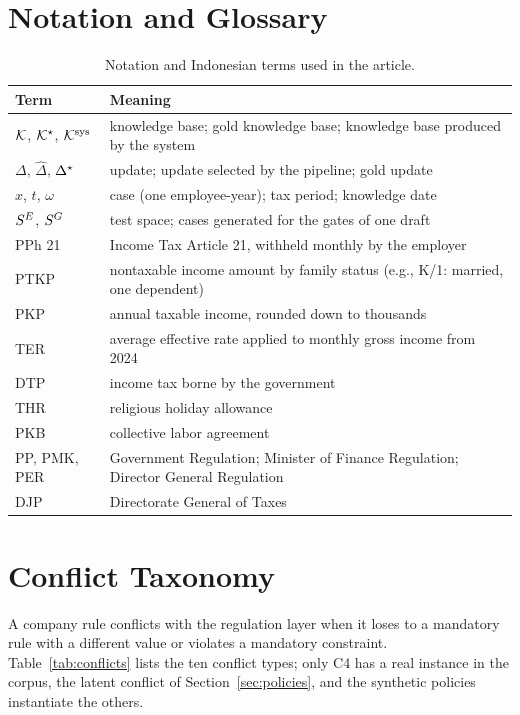 \section{Notation and Glossary}
\label{app:glossary}
\begin{table}[!h]
\caption{Notation and Indonesian terms used in the article.}
\label{tab:glossary}
\centering\footnotesize
\setlength{\tabcolsep}{3pt}
\begin{tabularx}{\columnwidth}{@{}lL@{}}
\toprule
Term & Meaning \\
\midrule
$\mathcal{K}$, $\mathcal{K}^\star$, $\mathcal{K}^{\mathrm{sys}}$ & knowledge base; gold knowledge base; knowledge base produced by the system \\
$\Delta$, $\hat{\Delta}$, $\Delta^\star$ & update; update selected by the pipeline; gold update \\
$x$, $t$, $\omega$ & case (one employee-year); tax period; knowledge date \\
$S^{E}$, $S^{G}$ & test space; cases generated for the gates of one draft \\
PPh 21 & Income Tax Article 21, withheld monthly by the employer \\
PTKP & nontaxable income amount by family status (e.g., K/1: married, one dependent) \\
PKP & annual taxable income, rounded down to thousands \\
TER & average effective rate applied to monthly gross income from 2024 \\
DTP & income tax borne by the government \\
THR & religious holiday allowance \\
PKB & collective labor agreement \\
PP, PMK, PER & Government Regulation; Minister of Finance Regulation; Director General Regulation \\
DJP & Directorate General of Taxes \\
\bottomrule
\end{tabularx}
\end{table}

\section{Conflict Taxonomy}
\label{app:taxonomies}
A company rule conflicts with the regulation layer when it loses to a mandatory rule with a different value or violates a mandatory constraint. Table~\ref{tab:conflicts} lists the ten conflict types; only C4 has a real instance in the corpus, the latent conflict of Section~\ref{sec:policies}, and the synthetic policies instantiate the others.

